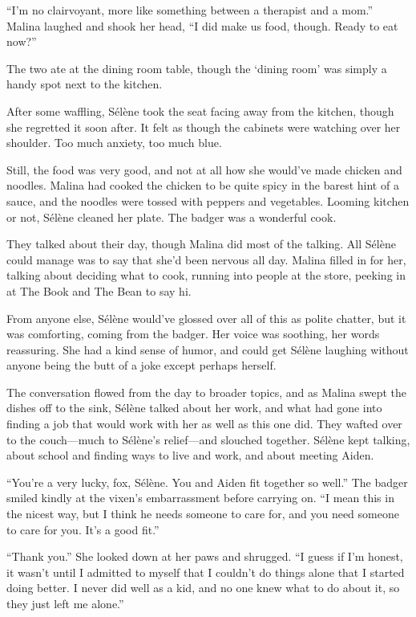 ``I'm no clairvoyant, more like something between a therapist and a mom.'' Malina laughed and shook her head, ``I did make us food, though. Ready to eat now?''

The two ate at the dining room table, though the `dining room' was simply a handy spot next to the kitchen.

After some waffling, Sélène took the seat facing away from the kitchen, though she regretted it soon after. It felt as though the cabinets were watching over her shoulder. Too much anxiety, too much blue.

Still, the food was very good, and not at all how she would've made chicken and noodles. Malina had cooked the chicken to be quite spicy in the barest hint of a sauce, and the noodles were tossed with peppers and vegetables. Looming kitchen or not, Sélène cleaned her plate. The badger was a wonderful cook.

They talked about their day, though Malina did most of the talking. All Sélène could manage was to say that she'd been nervous all day. Malina filled in for her, talking about deciding what to cook, running into people at the store, peeking in at The Book and The Bean to say hi.

From anyone else, Sélène would've glossed over all of this as polite chatter, but it was comforting, coming from the badger. Her voice was soothing, her words reassuring. She had a kind sense of humor, and could get Sélène laughing without anyone being the butt of a joke except perhaps herself.

The conversation flowed from the day to broader topics, and as Malina swept the dishes off to the sink, Sélène talked about her work, and what had gone into finding a job that would work with her as well as this one did. They wafted over to the couch---much to Sélène's relief---and slouched together. Sélène kept talking, about school and finding ways to live and work, and about meeting Aiden.

``You're a very lucky, fox, Sélène. You and Aiden fit together so well.'' The badger smiled kindly at the vixen's embarrassment before carrying on. ``I mean this in the nicest way, but I think he needs someone to care for, and you need someone to care for you. It's a good fit.''

``Thank you.'' She looked down at her paws and shrugged. ``I guess if I'm honest, it wasn't until I admitted to myself that I couldn't do things alone that I started doing better. I never did well as a kid, and no one knew what to do about it, so they just left me alone.''

